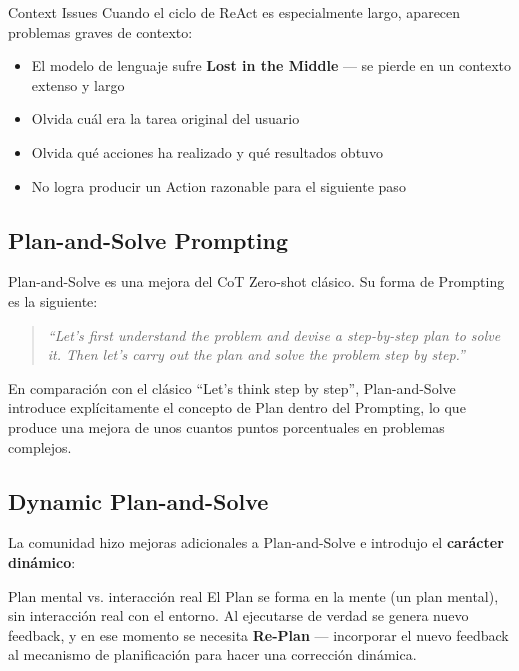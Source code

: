 \documentclass[a4paper]{article}
\begin{document}
\begin{warningbox}{Context Issues}
Cuando el ciclo de ReAct es especialmente largo, aparecen problemas graves de contexto:
\begin{itemize}
    \item El modelo de lenguaje sufre \textbf{Lost in the Middle} — se pierde en un contexto extenso y largo
    \item Olvida cuál era la tarea original del usuario
    \item Olvida qué acciones ha realizado y qué resultados obtuvo
    \item No logra producir un Action razonable para el siguiente paso
\end{itemize}
\end{warningbox}

\subsection{Plan-and-Solve Prompting}

Plan-and-Solve es una mejora del CoT Zero-shot clásico. Su forma de Prompting es la siguiente:

\begin{quote}
\textit{``Let's first understand the problem and devise a step-by-step plan to solve it. Then let's carry out the plan and solve the problem step by step.''}
\end{quote}

En comparación con el clásico ``Let's think step by step'', Plan-and-Solve introduce explícitamente el concepto de Plan dentro del Prompting, lo que produce una mejora de unos cuantos puntos porcentuales en problemas complejos.

\subsection{Dynamic Plan-and-Solve}

La comunidad hizo mejoras adicionales a Plan-and-Solve e introdujo el \textbf{carácter dinámico}:

\begin{importantbox}{Plan mental vs. interacción real}
El Plan se forma en la mente (un plan mental), sin interacción real con el entorno. Al ejecutarse de verdad se genera nuevo feedback, y en ese momento se necesita \textbf{Re-Plan} — incorporar el nuevo feedback al mecanismo de planificación para hacer una corrección dinámica.
\end{importantbox}
\end{document}
